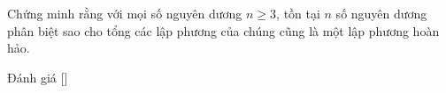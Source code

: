\ifshowproblem
\begin{problem}\label{problem:BGR-2015-EGMO-TST-P6}
	Chứng minh rằng với mọi số nguyên dương \( n \geq 3 \),
	tồn tại \( n \) số nguyên dương phân biệt sao cho tổng các lập phương của chúng cũng là một lập phương hoàn hảo.
\end{problem}
\fi

\ifshowinfo
Đánh giá [\textbf{}]\footnotemark
{}
\fi
